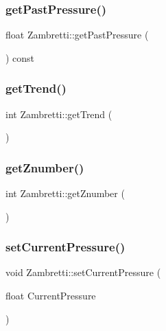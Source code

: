 \mbox{\label{class_zambretti_a1c420aa581bae4f38859f110e6d2d876}} 
\subsubsection{\texorpdfstring{get\+Past\+Pressure()}{getPastPressure()}}
{\footnotesize\ttfamily float Zambretti\+::get\+Past\+Pressure (\begin{DoxyParamCaption}{ }\end{DoxyParamCaption}) const}

\mbox{\label{class_zambretti_ac46339c15cde0687b2008e4df0ecb4f9}} 
\subsubsection{\texorpdfstring{get\+Trend()}{getTrend()}}
{\footnotesize\ttfamily int Zambretti\+::get\+Trend (\begin{DoxyParamCaption}{ }\end{DoxyParamCaption})}

\mbox{\label{class_zambretti_aac68758fdd41eb35c8ccd832e7b82e66}} 
\subsubsection{\texorpdfstring{get\+Znumber()}{getZnumber()}}
{\footnotesize\ttfamily int Zambretti\+::get\+Znumber (\begin{DoxyParamCaption}{ }\end{DoxyParamCaption})}

\mbox{\label{class_zambretti_a9c0ea9c2f5d6b18f716b91c71088f208}} 
\subsubsection{\texorpdfstring{set\+Current\+Pressure()}{setCurrentPressure()}}
{\footnotesize\ttfamily void Zambretti\+::set\+Current\+Pressure (\begin{DoxyParamCaption}\item[{float}]{Current\+Pressure }\end{DoxyParamCaption})}

